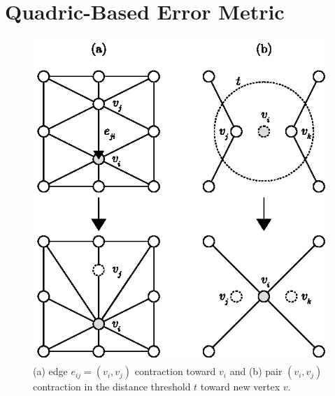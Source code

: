 \section{Quadric-Based Error Metric} \label{sec:quadric-based_error_metric}
\iffalse %
\begin{figure}[ht]
    \centering
    \begin{minipage}{0.49\textwidth}
        \centering
        \includegraphics[width=\textwidth]{figures/contraction_types.eps}
        \caption{(a) edge \(e_{ij} = (v_i, v_j)\) contraction toward \(v_i\)
                 and (b) pair \((v_i, v_j)\) contraction in the distance threshold \(t\) toward new vertex \(v\).}
        \label{fig:contractions}
    \end{minipage} \hfill
    \begin{minipage}{0.485\textwidth}
        \centering

\end{minipage}
\end{figure}

